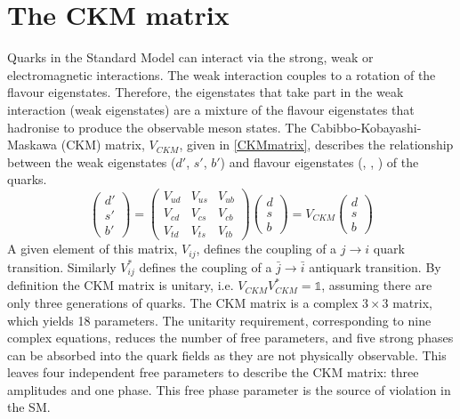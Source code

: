 \section{The CKM matrix}

Quarks in the Standard Model can interact via the strong, weak or electromagnetic interactions. The weak interaction couples to a rotation of the flavour eigenstates.
Therefore, the eigenstates that take part in the weak interaction (weak eigenstates) are a mixture of the flavour eigenstates that hadronise to produce the observable meson states. The Cabibbo-Kobayashi-Maskawa (CKM) matrix, $V_{CKM}$, given in \eqn\ref{CKMmatrix}, describes the relationship between the weak eigenstates ($d'$, $s'$, $b'$) and flavour eigenstates (\dquark, \squark, \bquark) of the quarks. 
\begin{equation}
\left(
\begin{array}{c} d' \\ s' \\ b'  \end{array} \right) =
\begin{pmatrix} V_{ud} & V_{us} & V_{ub} \\ V_{cd} & V_{cs} & V_{cb} \\ V_{td} & V_{ts} & V_{tb} \end{pmatrix} \left( 
\begin{array}{c} d \\ s \\ b \end{array} \right) =
V_{CKM} \left( \begin{array}{c} d \\ s \\ b \end{array} \right)
\label{CKMmatrix}
\end{equation}
A given element of this matrix, $V_{ij}$, defines the coupling of a $j \to i$ quark transition. Similarly $V_{ij}^*$ defines the coupling of a $\bar{j} \to \bar{i}$ antiquark transition. By definition the CKM matrix is unitary, i.e. $V_{CKM}V_{CKM}^* = \mathds{1}$, assuming there are only three generations of quarks. The CKM matrix is a complex $3 \times 3$ matrix, which yields 18 parameters. The unitarity requirement, corresponding to nine complex equations, reduces the number of free parameters, and five strong phases can be absorbed into the quark fields as they are not physically observable. This leaves four independent free parameters to describe the CKM matrix: three amplitudes and one phase. This free phase parameter is the source of \CP violation in the SM. 

